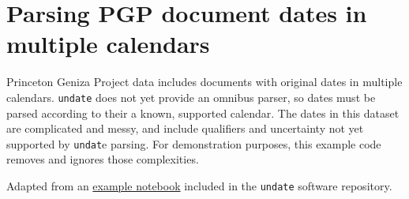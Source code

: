 \documentclass[final]{anthology-ch} %
\begin{document}
\printbibliography

\appendix

\section{Parsing PGP document dates in multiple calendars} \label{appdx:parse-pgp-dates}

Princeton Geniza Project data includes documents with original dates in multiple calendars.  \texttt{undate} does not yet provide an omnibus parser, so dates must be parsed according to their a known, supported calendar.  The dates in this dataset are complicated and messy, and include qualifiers and uncertainty not yet supported by \texttt{undat}e parsing. For demonstration purposes, this example code removes and ignores those complexities.

Adapted from an \href{https://github.com/dh-tech/undate-python/blob/main/examples/pgp_dates.ipynb}{example notebook} included in the \texttt{undate} software repository.
\end{document}
